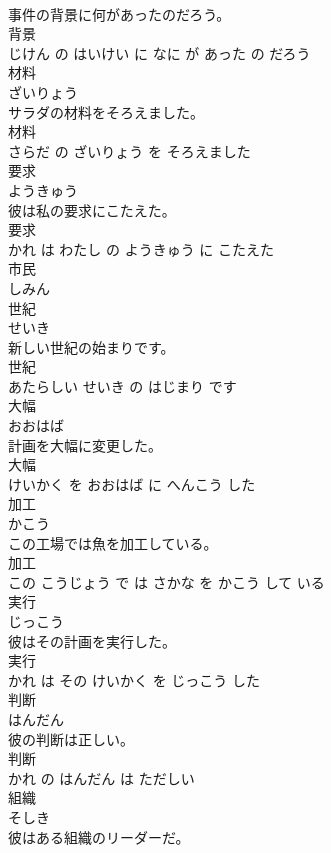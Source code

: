 \documentclass[8pt]{extreport}
\begin{document}
\begin{CJK}{UTF8}{min}
\\	事件の背景に何があったのだろう。	
\\	背景 
\\	じけん の はいけい に なに が あった の だろう			
\\	材料	
\\	ざいりょう			
\\	サラダの材料をそろえました。	
\\	材料 
\\	さらだ の ざいりょう を そろえました			
\\	要求	
\\	ようきゅう			
\\	彼は私の要求にこたえた。	
\\	要求 
\\	かれ は わたし の ようきゅう に こたえた			
\\	市民	
\\	しみん			
\\	世紀	
\\	せいき			
\\	新しい世紀の始まりです。	
\\	世紀 
\\	あたらしい せいき の はじまり です			
\\	大幅	
\\	おおはば			
\\	計画を大幅に変更した。	
\\	大幅 
\\	けいかく を おおはば に へんこう した			
\\	加工	
\\	かこう			
\\	この工場では魚を加工している。	
\\	加工 
\\	この こうじょう で は さかな を かこう して いる			
\\	実行	
\\	じっこう			
\\	彼はその計画を実行した。	
\\	実行 
\\	かれ は その けいかく を じっこう した			
\\	判断	
\\	はんだん			
\\	彼の判断は正しい。	
\\	判断 
\\	かれ の はんだん は ただしい			
\\	組織	
\\	そしき			
\\	彼はある組織のリーダーだ。	

\end{CJK}
\end{document}
